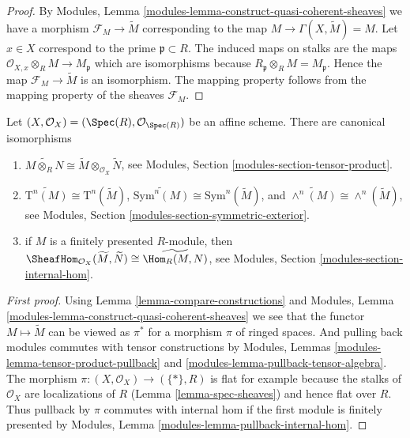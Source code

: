 \begin{proof}
By Modules, Lemma \ref{modules-lemma-construct-quasi-coherent-sheaves}
we have a morphism $\mathcal{F}_M \to \widetilde M$ corresponding
to the map $M \to \Gamma(X, \widetilde M) = M$. Let $x \in X$
correspond to the prime $\mathfrak p \subset R$.
The induced maps on stalks are the maps
$\mathcal{O}_{X, x} \otimes_R M \to M_{\mathfrak p}$
which are isomorphisms because
$R_{\mathfrak p} \otimes_R M = M_{\mathfrak p}$.
Hence the map $\mathcal{F}_M \to \widetilde M$ is an isomorphism.
The mapping property follows from the mapping property of
the sheaves $\mathcal{F}_M$.
\end{proof}

\begin{lemma}
\label{lemma-widetilde-constructions}
Let $(X, \mathcal{O}_X) = (\Spec(R), \mathcal{O}_{\Spec(R)})$
be an affine scheme. There are canonical isomorphisms
\begin{enumerate}
\item
$
\widetilde{M \otimes_R N}
\cong
\widetilde M \otimes_{\mathcal{O}_X} \widetilde N
$,
see Modules, Section \ref{modules-section-tensor-product}.
\item
$
\widetilde{\text{T}^n(M)}
\cong
\text{T}^n(\widetilde M)
$,
$
\widetilde{\text{Sym}^n(M)}
\cong
\text{Sym}^n(\widetilde M)
$, and
$
\widetilde{\wedge^n(M)}
\cong
\wedge^n(\widetilde M)
$,
see
Modules, Section \ref{modules-section-symmetric-exterior}.
\item if $M$ is a finitely presented $R$-module, then
$
\SheafHom_{\mathcal{O}_X}(\widetilde M, \widetilde N)
\cong
\widetilde{\Hom_R(M,  N)}
$,
see
Modules, Section \ref{modules-section-internal-hom}.
\end{enumerate}
\end{lemma}

\begin{proof}[First proof]
Using Lemma \ref{lemma-compare-constructions} and
Modules, Lemma \ref{modules-lemma-construct-quasi-coherent-sheaves}
we see that the functor $M \mapsto \widetilde M$ can be viewed
as $\pi^*$ for a morphism $\pi$ of ringed spaces.
And pulling back modules commutes with tensor constructions by
Modules, Lemmas \ref{modules-lemma-tensor-product-pullback}
and \ref{modules-lemma-pullback-tensor-algebra}.
The morphism $\pi : (X, \mathcal{O}_X) \to (\{*\}, R)$ is
flat for example because the stalks of $\mathcal{O}_X$ are
localizations of $R$ (Lemma \ref{lemma-spec-sheaves})
and hence flat over $R$. Thus pullback by $\pi$ commutes
with internal hom if the first module is finitely presented by
Modules, Lemma \ref{modules-lemma-pullback-internal-hom}.
\end{proof}

